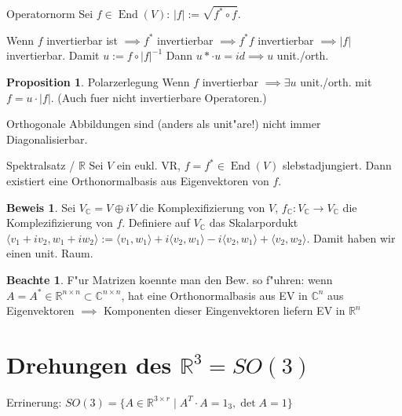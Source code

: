 \documentclass[oneside,fontsize=11pt,paper=a4,BCOR=0mm,DIV=12,automark,headsepline]{scrbook}
\DeclareMathOperator{\mEnd}{End}
\theoremstyle{remark}
\theoremstyle{definition}
\newtheorem*{notte}{Beachte}
\newtheorem*{proposition}{Proposition}
\theoremstyle{definition}
\newtheorem*{prof}{Beweis}
\theoremstyle{remark}
\begin{document}
\begin{definition}{Operatornorm}{}
  Sei $f\in \mEnd (V)$: $|f|:= \sqrt{f^*\circ f}$.
\end{definition}
\begin{relation}
  Wenn $f$ invertierbar ist $\implies f^*$ invertierbar $\implies f^* f$
  invertierbar $\implies |f| $ invertierbar.
  Damit $u:= f\circ |f|^{-1}$ Dann $u* \cdot u=id \implies u$ unit./orth.
\end{relation}

\begin{proposition}{Polarzerlegung}
  Wenn $f$ invertierbar $\implies \exists u$ unit./orth. mit $f=u\cdot |f|$.
  (Auch fuer nicht invertierbare Operatoren.)
\end{proposition}

\begin{relation}
  Orthogonale Abbildungen sind (anders als unit"are!) nicht immer Diagonalisierbar.
\end{relation}
\begin{satz}{Spektralsatz / $\mathbb{R}$}
  Sei $V$ ein eukl. VR, $f=f^* \in \mEnd (V)$ slebstadjungiert. Dann existiert
  eine Orthonormalbasis aus Eigenvektoren von $f$.
\end{satz}
\begin{prof}
  Sei $V_{\mathbb{C}}=V \oplus iV$ die Komplexifizierung von $V$,
  $f_{\mathbb{C}}: V_{\mathbb{C}} \rightarrow V_{\mathbb{C}}$ die
  Komplezifizierung von $f$. Definiere auf $V_{\mathbb{C}}$ das Skalarpordukt
  $\langle {v_1+ iv_2, w_1+ iw_2} \rangle := \langle {v_1, w_1} \rangle + i
  \langle {v_2, w_1} \rangle - i \langle {v_2, w_1} \rangle + \langle {v_2, w_2}
  \rangle$. Damit haben wir einen unit. Raum.
\end{prof}

\begin{notte}
  F"ur Matrizen koennte man den Bew. so f"uhren: wenn $A=A^* \in \mathbb{R}^{n
    \times n} \subset \mathbb{C}^{n\times n}$, hat eine Orthonormalbasis aus EV
  in $\mathbb{C}^n$ aus Eigenvektoren $\implies$ Komponenten dieser
  Eingenvektoren liefern EV in $\mathbb{R}^n$
\end{notte}


\section{Drehungen des $\mathbb{R}^3 = SO(3)$}
Errinerung: $SO(3) = \{A\in \mathbb{R}^{3\times r}\mid A^T \cdot A = 1_3, \det A
= 1\}$
\end{document}
